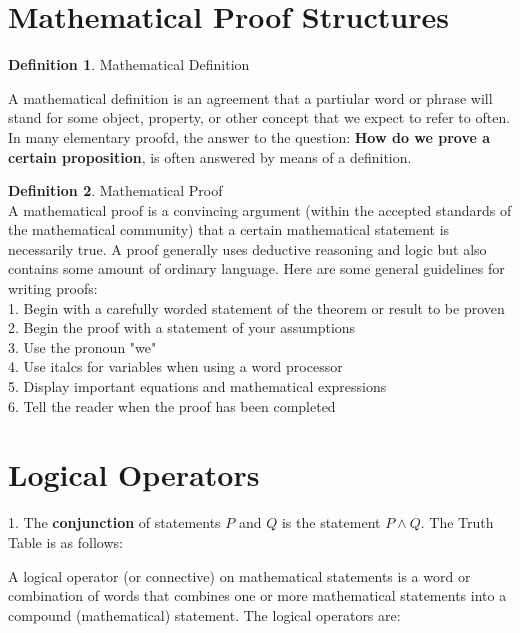 \documentclass{book}
\theoremstyle{definition}
\newtheorem{definition}{Definition}[section]
\theoremstyle{remark}
\begin{document}
\newpage
\section{Mathematical Proof Structures}

\begin{definition}
Mathematical Definition

A mathematical definition is an agreement that a partiular word or phrase will stand for some object, property, or other concept that we expect to refer to often. In many elementary proofd, the answer to the question: {\bf How do we prove a certain proposition}, is often answered by means of a definition. 
\end{definition}


\begin{definition}
Mathematical Proof \\

A mathematical proof is a convincing argument (within the accepted standards of the mathematical community) that a certain mathematical statement is necessarily true. A proof generally uses deductive reasoning and logic but also contains some amount of ordinary language. Here are some general guidelines for writing proofs: \\
1. Begin with a carefully worded statement of the theorem or result to be proven \\
2. Begin the proof with a statement of your assumptions \\
3. Use the pronoun "we" \\
4. Use italcs for variables when using a word processor \\
5. Display important equations and mathematical expressions \\
6. Tell the reader when the proof has been completed \\
\end{definition}







\newpage
\section{Logical Operators}

1. The {\bf conjunction} of statements $P$ and $Q$ is the statement $P \wedge Q$. The Truth Table is as follows: 

A logical operator (or connective) on mathematical statements is a word or combination of words that combines one or more mathematical statements into a compound (mathematical) statement. The logical operators are: \\
\end{document}
